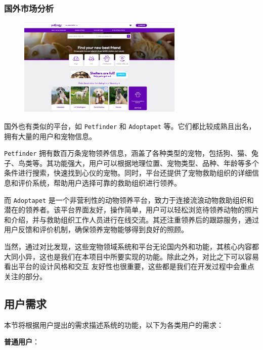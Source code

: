 \documentclass[12pt,a4paper,UTF8]{article}
\begin{document}
\subsubsection{国外市场分析}

\begin{figure}[!htbp]
  \centering
  \includegraphics[width=0.7\textwidth]{figures/petfinder.png}
\end{figure}

国外也有类似的平台，如 \verb|Petfinder| 和 \verb|Adoptapet| 等。它们都比较成熟且出名，拥有大量的用户和宠物信息。

\verb|Petfinder| 拥有数百万条宠物领养信息，涵盖了各种类型的宠物，包括狗、猫、兔子、鸟类等。其功能强大，用户可以根据地理位置、宠物类型、品种、年龄等多个条件进行搜索，快速找到心仪的宠物。同时，平台还提供了宠物救助组织的详细信息和评价系统，帮助用户选择可靠的救助组织进行领养。

而 \verb|Adoptapet| 是一个非营利性的动物领养平台，致力于连接流浪动物救助组织和潜在的领养者。该平台界面友好，操作简单，用户可以轻松浏览待领养动物的照片和介绍，并与救助组织工作人员进行在线交流。其还注重领养后的跟踪服务，通过用户反馈和评价机制，确保领养宠物能够得到良好的照顾。

当然，通过对比发现，这些宠物领域系统和平台无论国内外和功能，其核心内容都大同小异，这也是我们在本项目中所要实现的功能。除此之外，对比之下可以容易看出平台的设计风格和交互
友好性也很重要，这些都是我们在开发过程中会重点关注的部分。



\subsection{用户需求}

本节将根据用户提出的需求描述系统的功能，以下为各类用户的需求：

\vspace{0.25cm} %

\noindent\textbf{普通用户}：
\end{document}
